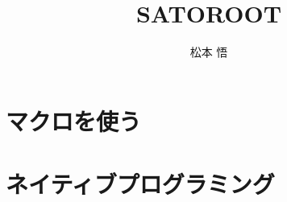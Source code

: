 \documentclass[openany]{report}
\begin{document}
\title{ \fontsize{60pt}{40pt}\selectfont SATOROOT}
\author{松本 悟}
\maketitle

\pagestyle{fancy}
\fancyhead{}
\fancyhead[RO,RE]{\rightmark}
\fancyhead[LE,LO]{\leftmark}
\cfoot{\thepage} 

\renewcommand{\sectionmark}[1]{\markright{\thesection \ \ #1}{}}

\newcommand{\ROOT}{\texttt{ROOT}}
\newcommand{\Cpp}{\texttt{C++}}





\tableofcontents

\chapter{マクロを使う}
\setcounter{page}{1}














\chapter{ネイティブプログラミング}







\clearpage
\appendix




\end{document}
